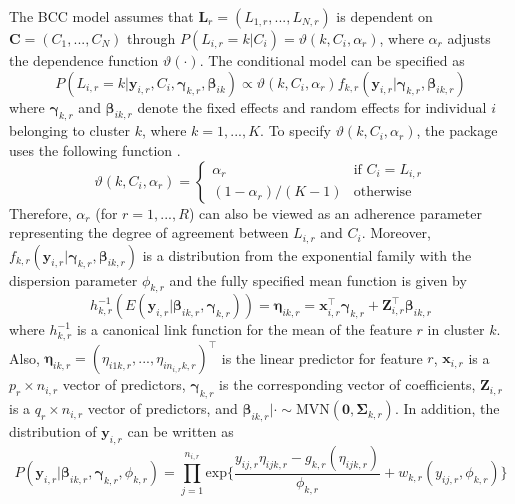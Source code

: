 The BCC model assumes that $\boldsymbol{L}_{r} = (L_{1,r},...,L_{N,r})$ is dependent on $\boldsymbol{C} = (C_1,...,C_N)$ through $P(L_{i,r}=k|C_i) = \vartheta(k,C_i, \alpha_r)$, where $\alpha_r$ adjusts the dependence function $\vartheta(\cdot)$. The conditional model can be specified as 
\begin{equation}
P(L_{i,r}=k|\boldsymbol{y}_{i,r},C_i,\boldsymbol{\gamma}_{k,r}, \boldsymbol{\beta}_{ik}) \propto\vartheta(k,C_i,\alpha_r)f_{k,r}(\boldsymbol{y}_{i,r}|\boldsymbol{\gamma}_{k,r}, \boldsymbol{\beta}_{ik,r})
\end{equation}
where $\boldsymbol{\gamma}_{k,r}$ and $\boldsymbol{\beta}_{ik,r}$ denote the fixed effects and random effects for individual $i$ belonging to cluster $k$, where $k=1,...,K$. To specify $\vartheta(k,C_i,\alpha_r)$, the package uses the following function \citep{Lock2013}. 
\begin{equation}
  \vartheta(k,C_i,\alpha_r)  =
    \begin{cases}
      \alpha_r & \text{if } C_i = L_{i,r}\\
      (1- \alpha_r)/(K-1) & \text{otherwise}
    \end{cases}       
\end{equation}
Therefore, $\alpha_r$ (for $r = 1,...,R$) can also be viewed as an adherence parameter representing the degree of agreement between $L_{i,r}$ and $C_i$. Moreover, $ f_{k,r}(\boldsymbol{y}_{i,r}|\boldsymbol{\gamma}_{k,r}, \boldsymbol{\beta}_{ik,r})$ is a distribution from the exponential family with the dispersion parameter $\phi_{k,r}$ and the fully specified mean function is given by 
\begin{equation}
h^{-1}_{k,r}(E(\boldsymbol{y}_{i,r}|\boldsymbol{\beta}_{ik,r},\boldsymbol{\gamma}_{k,r})) = \boldsymbol{\eta}_{ik,r} = \boldsymbol{x}_{i,r}^\top\boldsymbol{\gamma}_{k,r} +  \boldsymbol{Z}_{i,r}^\top\boldsymbol{\beta}_{ik,r}
\end{equation}
where $h_{k,r}^{-1}$ is a canonical link function for the mean of the feature $r$ in cluster $k$. Also, $\boldsymbol{\eta}_{ik,r} = (\eta_{i1k,r},...,\eta_{in_{i,r}k,r})^\top$ is the linear predictor for feature $r$, $\boldsymbol{x}_{i,r}$ is a $p_r\times n_{i,r}$ vector of predictors, $\boldsymbol{\gamma}_{k,r}$ is the corresponding vector of coefficients, $\boldsymbol{Z}_{i,r}$ is a $q_r\times n_{i,r}$ vector of predictors, and $\boldsymbol{\beta}_{ik,r}|\cdot \sim \text{MVN}(\boldsymbol{0},\boldsymbol{\Sigma}_{k,r})$. In addition, the distribution of $\boldsymbol{y}_{i,r}$ can be written as
\begin{equation}
P(\boldsymbol{y}_{i,r}|\boldsymbol{\beta}_{ik,r},\boldsymbol{\gamma}_{k,r}, \phi_{k,r}) = \prod_{j=1}^{n_{i,r}} \text{exp}\bigg\{ \frac{y_{ij,r}\eta_{ijk,r} - g_{k,r}(\eta_{ijk,r})}{\phi_{k,r}} + w_{k,r}(y_{ij,r},\phi_{k,r}) \bigg\} 
\end{equation}
